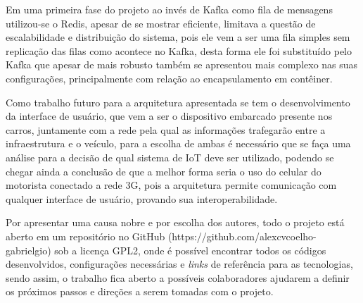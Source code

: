 Em uma primeira fase do projeto ao invés de Kafka como fila de mensagens utilizou-se o Redis, apesar de se mostrar eficiente, limitava a questão de escalabilidade e distribuição do sistema, pois ele vem a ser uma fila simples sem replicação das filas como acontece no Kafka, desta forma ele foi substituído pelo Kafka que apesar de mais robusto também se apresentou mais complexo nas suas configurações, principalmente com relação ao encapsulamento em contêiner.

Como trabalho futuro para a arquitetura apresentada se tem o desenvolvimento da interface de usuário, que vem a ser o dispositivo embarcado presente nos carros, juntamente com a rede pela qual as informações trafegarão entre a infraestrutura e o veículo, para a escolha de ambas é necessário que se faça uma análise para a decisão de qual sistema de IoT deve ser utilizado, podendo se chegar ainda a conclusão de que a melhor forma seria o uso do celular do motorista conectado a rede 3G, pois a arquitetura permite comunicação com qualquer interface de usuário, provando sua interoperabilidade. 

Por apresentar uma causa nobre e por escolha dos autores, todo o projeto está aberto em um repositório no GitHub (https://github.com/alexcvcoelho-gabrielgio) sob a licença GPL2, onde é possível encontrar todos os códigos desenvolvidos, configurações necessárias e \textit{links} de referência para as tecnologias, sendo assim, o trabalho fica aberto a possíveis colaboradores ajudarem a definir os próximos passos e direções a serem tomadas com o projeto.

